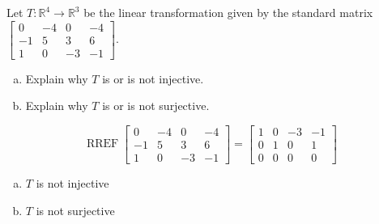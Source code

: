 
\begin{exerciseStatement}
 Let \(T:\mathbb{R}^ 4  \to \mathbb{R}^ 3 \) be the linear transformation given by the standard matrix \( \left[\begin{array}{cccc}
0 & -4 & 0 & -4 \\
-1 & 5 & 3 & 6 \\
1 & 0 & -3 & -1
\end{array}\right] .\)
\begin{enumerate}[(a)]
\item Explain why \(T\) is or is not injective.
\item Explain why \(T\) is or is not surjective.
\end{enumerate}
    
\end{exerciseStatement}
    
\begin{exerciseAnswer} 


\[\operatorname{RREF} \left[\begin{array}{cccc}
0 & -4 & 0 & -4 \\
-1 & 5 & 3 & 6 \\
1 & 0 & -3 & -1
\end{array}\right] = \left[\begin{array}{cccc}
1 & 0 & -3 & -1 \\
0 & 1 & 0 & 1 \\
0 & 0 & 0 & 0
\end{array}\right] \]


\begin{enumerate}[(a)]
\item \(T\) is not injective
\item \(T\) is not surjective
\end{enumerate}
    
\end{exerciseAnswer}
    
